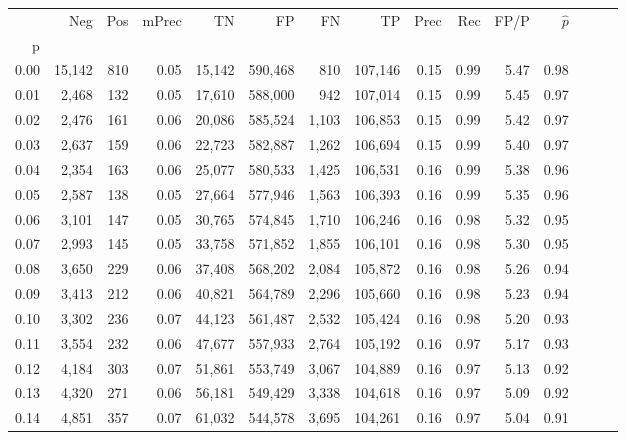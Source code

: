 \begin{tabular}{rrrrrrrrrrrrrrr}
\toprule
{} &     Neg &    Pos & mPrec &       TN &       FP &       FN &       TP &  Prec &   Rec &  FP/P & $\hat{p}$ \\
p    &         &        &       &          &          &          &          &       &       &       &           \\
\midrule
0.00 &  15,142 &    810 &  0.05 &   15,142 &  590,468 &      810 &  107,146 &  0.15 &  0.99 &  5.47 &      0.98 \\
0.01 &   2,468 &    132 &  0.05 &   17,610 &  588,000 &      942 &  107,014 &  0.15 &  0.99 &  5.45 &      0.97 \\
0.02 &   2,476 &    161 &  0.06 &   20,086 &  585,524 &    1,103 &  106,853 &  0.15 &  0.99 &  5.42 &      0.97 \\
0.03 &   2,637 &    159 &  0.06 &   22,723 &  582,887 &    1,262 &  106,694 &  0.15 &  0.99 &  5.40 &      0.97 \\
0.04 &   2,354 &    163 &  0.06 &   25,077 &  580,533 &    1,425 &  106,531 &  0.16 &  0.99 &  5.38 &      0.96 \\
0.05 &   2,587 &    138 &  0.05 &   27,664 &  577,946 &    1,563 &  106,393 &  0.16 &  0.99 &  5.35 &      0.96 \\
0.06 &   3,101 &    147 &  0.05 &   30,765 &  574,845 &    1,710 &  106,246 &  0.16 &  0.98 &  5.32 &      0.95 \\
0.07 &   2,993 &    145 &  0.05 &   33,758 &  571,852 &    1,855 &  106,101 &  0.16 &  0.98 &  5.30 &      0.95 \\
0.08 &   3,650 &    229 &  0.06 &   37,408 &  568,202 &    2,084 &  105,872 &  0.16 &  0.98 &  5.26 &      0.94 \\
0.09 &   3,413 &    212 &  0.06 &   40,821 &  564,789 &    2,296 &  105,660 &  0.16 &  0.98 &  5.23 &      0.94 \\
0.10 &   3,302 &    236 &  0.07 &   44,123 &  561,487 &    2,532 &  105,424 &  0.16 &  0.98 &  5.20 &      0.93 \\
0.11 &   3,554 &    232 &  0.06 &   47,677 &  557,933 &    2,764 &  105,192 &  0.16 &  0.97 &  5.17 &      0.93 \\
0.12 &   4,184 &    303 &  0.07 &   51,861 &  553,749 &    3,067 &  104,889 &  0.16 &  0.97 &  5.13 &      0.92 \\
0.13 &   4,320 &    271 &  0.06 &   56,181 &  549,429 &    3,338 &  104,618 &  0.16 &  0.97 &  5.09 &      0.92 \\
0.14 &   4,851 &    357 &  0.07 &   61,032 &  544,578 &    3,695 &  104,261 &  0.16 &  0.97 &  5.04 &      0.91 \\

\end{tabular}

